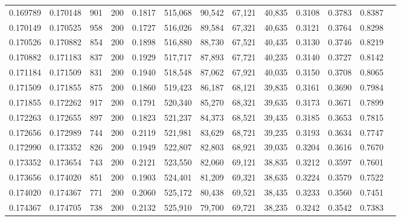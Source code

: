 \begin{tabular}{rrrrrrrrrrrrr}
0.169789 & 0.170148 &    901 & 200 &                                     0.1817 & 515,068 &  90,542 &  67,121 &  40,835 & 0.3108 & 0.3783 & 0.8387 \\
0.170149 & 0.170525 &    958 & 200 &                                     0.1727 & 516,026 &  89,584 &  67,321 &  40,635 & 0.3121 & 0.3764 & 0.8298 \\
0.170526 & 0.170882 &    854 & 200 &                                     0.1898 & 516,880 &  88,730 &  67,521 &  40,435 & 0.3130 & 0.3746 & 0.8219 \\
0.170882 & 0.171183 &    837 & 200 &                                     0.1929 & 517,717 &  87,893 &  67,721 &  40,235 & 0.3140 & 0.3727 & 0.8142 \\
0.171184 & 0.171509 &    831 & 200 &                                     0.1940 & 518,548 &  87,062 &  67,921 &  40,035 & 0.3150 & 0.3708 & 0.8065 \\
0.171509 & 0.171855 &    875 & 200 &                                     0.1860 & 519,423 &  86,187 &  68,121 &  39,835 & 0.3161 & 0.3690 & 0.7984 \\
0.171855 & 0.172262 &    917 & 200 &                                     0.1791 & 520,340 &  85,270 &  68,321 &  39,635 & 0.3173 & 0.3671 & 0.7899 \\
0.172263 & 0.172655 &    897 & 200 &                                     0.1823 & 521,237 &  84,373 &  68,521 &  39,435 & 0.3185 & 0.3653 & 0.7815 \\
0.172656 & 0.172989 &    744 & 200 &                                     0.2119 & 521,981 &  83,629 &  68,721 &  39,235 & 0.3193 & 0.3634 & 0.7747 \\
0.172990 & 0.173352 &    826 & 200 &                                     0.1949 & 522,807 &  82,803 &  68,921 &  39,035 & 0.3204 & 0.3616 & 0.7670 \\
0.173352 & 0.173654 &    743 & 200 &                                     0.2121 & 523,550 &  82,060 &  69,121 &  38,835 & 0.3212 & 0.3597 & 0.7601 \\
0.173656 & 0.174020 &    851 & 200 &                                     0.1903 & 524,401 &  81,209 &  69,321 &  38,635 & 0.3224 & 0.3579 & 0.7522 \\
0.174020 & 0.174367 &    771 & 200 &                                     0.2060 & 525,172 &  80,438 &  69,521 &  38,435 & 0.3233 & 0.3560 & 0.7451 \\
0.174367 & 0.174705 &    738 & 200 &                                     0.2132 & 525,910 &  79,700 &  69,721 &  38,235 & 0.3242 & 0.3542 & 0.7383 \\

\end{tabular}
